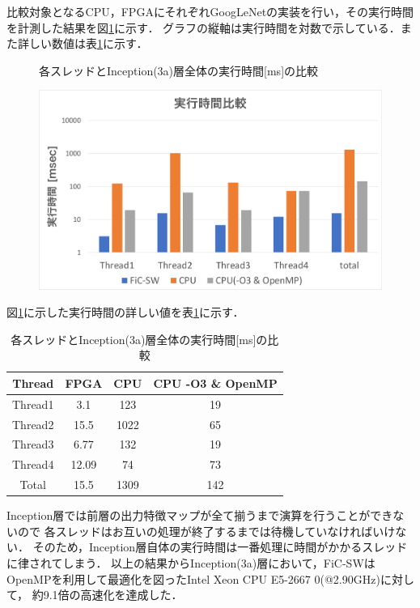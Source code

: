 {比較対象となるCPU，FPGAにそれぞれGoogLeNetの実装を行い，その実行時間を計測した結果を図\ref{fig:exec_graph}に示す．
グラフの縦軸は実行時間を対数で示している．また詳しい数値は表\ref{table:exec_time}に示す．

\begin{figure}[h]
    \centering
    \caption{各スレッドとInception(3a)層全体の実行時間[ms]の比較}
    \includegraphics[width=15cm]{./chap7/fig/exec_time.pdf}
    \caption{}
    \label{fig:exec_graph}
\end{figure}

図\ref{fig:exec_graph}に示した実行時間の詳しい値を表\ref{table:exec_time}に示す．

\begin{table}[p]
    \begin{center}
    \caption{各スレッドとInception(3a)層全体の実行時間[ms]の比較}
    \label{table:exec_time}
    \begin{tabular}{|c|c|c|c|} \hline
    \multicolumn{1}{|c|}{Thread} & \multicolumn{1}{|c|}{FPGA} & \multicolumn{1}{|c|}{CPU} & \multicolumn{1}{|c|}{CPU -O3 \& OpenMP} \\ \hline \hline
    Thread1       & 3.1 & 123 & 19 \\ \hline
    Thread2       & 15.5 & 1022 & 65 \\ \hline
    Thread3       & 6.77 & 132 & 19 \\ \hline
    Thread4       & 12.09 & 74 & 73 \\ \hline
    Total         & 15.5 & 1309 & 142 \\ \hline
    \end{tabular}
    \end{center}
\end{table}

Inception層では前層の出力特徴マップが全て揃うまで演算を行うことができないので
各スレッドはお互いの処理が終了するまでは待機していなければいけない．
そのため，Inception層自体の実行時間は一番処理に時間がかかるスレッドに律されてしまう．
以上の結果からInception(3a)層において，FiC-SWはOpenMPを利用して最適化を図ったIntel Xeon CPU E5-2667 0(@2.90GHz)に対して，
約9.1倍の高速化を達成した．
}
